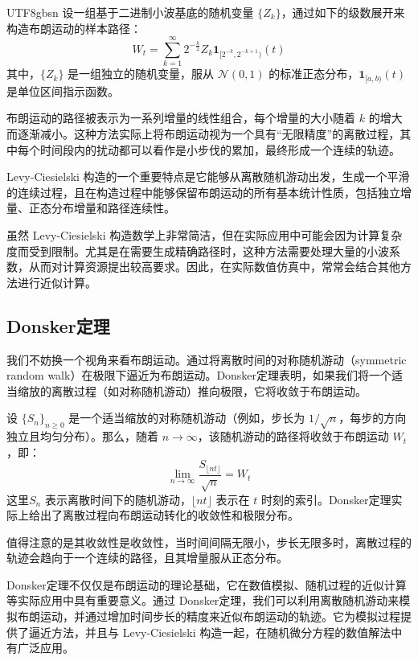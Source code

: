 \documentclass{article}
\begin{document}
\begin{CJK*}{UTF8}{gbsn}
设一组基于二进制小波基底的随机变量 $\{Z_k\}$，通过如下的级数展开来构造布朗运动的样本路径：
\[
W_t = \sum_{k=1}^{\infty} 2^{-\frac{k}{2}} Z_k \mathbf{1}_{[2^{-k}, 2^{-k+1})}(t)
\]
其中，$\{Z_k\}$ 是一组独立的随机变量，服从 $\mathcal{N}(0,1)$ 的标准正态分布，$\mathbf{1}_{[a,b)}(t)$ 是单位区间指示函数。

布朗运动的路径被表示为一系列增量的线性组合，每个增量的大小随着 $k$ 的增大而逐渐减小。这种方法实际上将布朗运动视为一个具有“无限精度”的离散过程，其中每个时间段内的扰动都可以看作是小步伐的累加，最终形成一个连续的轨迹。

Levy-Ciesielski 构造的一个重要特点是它能够从离散随机游动出发，生成一个平滑的连续过程，且在构造过程中能够保留布朗运动的所有基本统计性质，包括独立增量、正态分布增量和路径连续性。

虽然 Levy-Ciesielski 构造数学上非常简洁，但在实际应用中可能会因为计算复杂度而受到限制。尤其是在需要生成精确路径时，这种方法需要处理大量的小波系数，从而对计算资源提出较高要求。因此，在实际数值仿真中，常常会结合其他方法进行近似计算。

\subsection{Donsker定理}

我们不妨换一个视角来看布朗运动。通过将离散时间的对称随机游动（symmetric random walk）在极限下逼近为布朗运动。Donsker定理表明，如果我们将一个适当缩放的离散过程（如对称随机游动）推向极限，它将收敛于布朗运动。

设 $\{S_n\}_{n \geq 0}$ 是一个适当缩放的对称随机游动（例如，步长为 $1/\sqrt{n}$，每步的方向独立且均匀分布）。那么，随着 $n \to \infty$，该随机游动的路径将收敛于布朗运动 $W_t$，即：
\[
\lim_{n \to \infty} \frac{S_{\lfloor nt \rfloor}}{\sqrt{n}} = W_t
\]
这里$S_n$ 表示离散时间下的随机游动，$\lfloor nt \rfloor$ 表示在 $t$ 时刻的索引。Donsker定理实际上给出了离散过程向布朗运动转化的收敛性和极限分布。

值得注意的是其收敛性是收敛性，当时间间隔无限小，步长无限多时，离散过程的轨迹会趋向于一个连续的路径，且其增量服从正态分布。

Donsker定理不仅仅是布朗运动的理论基础，它在数值模拟、随机过程的近似计算等实际应用中具有重要意义。通过 Donsker定理，我们可以利用离散随机游动来模拟布朗运动，并通过增加时间步长的精度来近似布朗运动的轨迹。它为模拟过程提供了逼近方法，并且与 Levy-Ciesielski 构造一起，在随机微分方程的数值解法中有广泛应用。

\end{CJK*}
\end{document}
